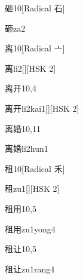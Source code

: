 \begin{entry}{砸}{10}[Radical 石]
  \begin{phonetics}{砸}{za2}
  \end{phonetics}
\end{entry}

\begin{entry}{离}{10}[Radical 亠]
  \begin{phonetics}{离}{li2}[][HSK 2]
  \end{phonetics}
\end{entry}

\begin{entry}{离开}{10,4}
  \begin{phonetics}{离开}{li2kai1}[][HSK 2]
  \end{phonetics}
\end{entry}

\begin{entry}{离婚}{10,11}
  \begin{phonetics}{离婚}{li2hun1}
  \end{phonetics}
\end{entry}

\begin{entry}{租}{10}[Radical 禾]
  \begin{phonetics}{租}{zu1}[][HSK 2]
  \end{phonetics}
\end{entry}

\begin{entry}{租用}{10,5}
  \begin{phonetics}{租用}{zu1yong4}
  \end{phonetics}
\end{entry}

\begin{entry}{租让}{10,5}
  \begin{phonetics}{租让}{zu1rang4}
  \end{phonetics}
\end{entry}

